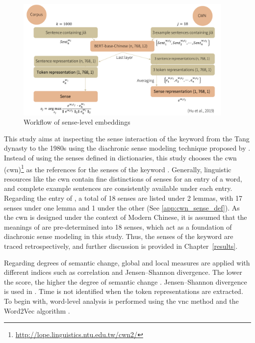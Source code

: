 \begin{figure}[H]
  \centering
  \includegraphics[height=0.4\textheight,width=0.95\textwidth,keepaspectratio]{figures_new/from_slides/workflow_sense_level.pdf}
  \caption{Workflow of sense-level embeddings}
  \label{fig:workflow_sense_level}
\end{figure}

This study aims at inspecting the sense interaction of the keyword \jia from the Tang dynasty to the 1980s using the diachronic sense modeling technique proposed by \textcite{hu2019diachronic}. Instead of using the senses defined in dictionaries, this study chooses the \acrlong{cwn} (\acrshort{cwn})\footnote{\url{http://lope.linguistics.ntu.edu.tw/cwn2/}} \parencite{huang2010infrastructure} as the references for the senses of the keyword \jia\rspace . Generally, linguistic resources like the \gls{cwn} contain fine distinctions of senses for an entry of a word, and complete example sentences are consistently available under each entry. Regarding the entry of \jia\rspace , a total of 18 senses are listed under 2 lemmas, with 17 senses under one lemma and 1 under the other (See \ref{app:cwn_sense_def}). As the \gls{cwn} is designed under the context of Modern Chinese, it is assumed that the meanings of \jia are pre-determined into 18 senses, which act as a foundation of diachronic sense modeling in this study. Thus, the senses of the keyword \jia are traced retrospectively, and further discussion is provided in Chapter~\ref{results}.

Regarding degrees of semantic change, global and local measures are applied with different indices such as correlation and Jensen–Shannon divergence. The lower the score, the higher the degree of semantic change \parencite{hamilton2016law}. Jensen–Shannon divergence is used in \textcite{giulianelli2019lexical}. Time is not identified when the token representations are extracted. To begin with, word-level analysis is performed using the \gls{vnc} method \parencite{gries2012variability} and the Word2Vec algorithm \parencite{mikolov2013efficient}.

